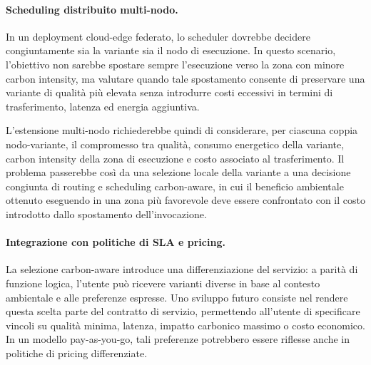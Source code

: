 \paragraph{Scheduling distribuito multi-nodo.}
In un deployment cloud-edge federato, lo scheduler dovrebbe decidere
congiuntamente sia la variante sia il nodo di esecuzione. In questo scenario,
l'obiettivo non sarebbe spostare sempre l'esecuzione verso la zona con minore
carbon intensity, ma valutare quando tale spostamento consente di preservare
una variante di qualità più elevata senza introdurre costi eccessivi in termini
di trasferimento, latenza ed energia aggiuntiva.

L'estensione multi-nodo richiederebbe quindi di considerare, per ciascuna
coppia nodo-variante, il compromesso tra qualità, consumo energetico della
variante, carbon intensity della zona di esecuzione e costo associato al
trasferimento. Il problema passerebbe così da una selezione locale della
variante a una decisione congiunta di routing e scheduling carbon-aware, in
cui il beneficio ambientale ottenuto eseguendo in una zona più favorevole deve
essere confrontato con il costo introdotto dallo spostamento dell'invocazione.

\paragraph{Integrazione con politiche di SLA e pricing.}
La selezione carbon-aware introduce una differenziazione del servizio: a
parità di funzione logica, l'utente può ricevere varianti diverse in base
al contesto ambientale e alle preferenze espresse. Uno sviluppo futuro
consiste nel rendere questa scelta parte del contratto di servizio,
permettendo all'utente di specificare vincoli su qualità minima, latenza,
impatto carbonico massimo o costo economico. In un modello pay-as-you-go,
tali preferenze potrebbero essere riflesse anche in politiche di pricing
differenziate.
